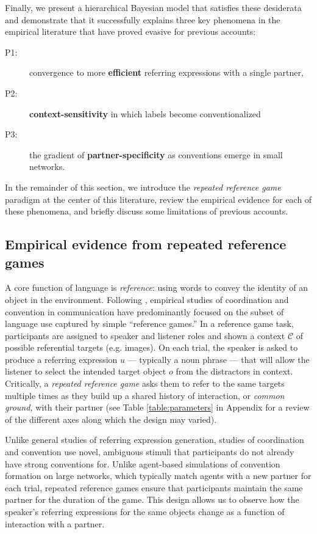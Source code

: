 Finally, we present a hierarchical Bayesian model that satisfies these desiderata and demonstrate that it successfully explains three key phenomena in the empirical literature that have proved evasive for previous accounts: 
\begin{description}
\item[P1:] convergence to more \textbf{efficient} referring expressions with a single partner, 
\item[P2:] \textbf{context-sensitivity} in which labels become conventionalized
\item[P3:] the gradient of \textbf{partner-specificity} as conventions emerge in small networks.
\end{description}
In the remainder of this section, we introduce the \emph{repeated reference game} paradigm at the center of this literature, review the empirical evidence for each of these phenomena, and briefly discuss some limitations of previous accounts.

\subsection{Empirical evidence from repeated reference games}

A core function of language is \emph{reference}: using words to convey the identity of an object in the environment. 
Following , empirical studies of coordination and convention in communication have predominantly focused on the subset of language use captured by simple ``reference games.'' 
In a reference game task, participants are assigned to speaker and listener roles and shown a context $\mathcal{C}$ of possible referential targets (e.g. images).
On each trial, the speaker is asked to produce a referring expression $u$ --- typically a noun phrase --- that will allow the listener to select the intended target object $o$ from the distractors in context.
Critically, a \emph{repeated reference game} asks them to refer to the same targets multiple times as they build up a shared history of interaction, or \emph{common ground,} with their partner (see Table \ref{table:parameters} in Appendix for a review of the different axes along which the design may varied).

Unlike general studies of referring expression generation, studies of coordination and convention use novel, ambiguous stimuli that participants do not already have strong conventions for.
Unlike agent-based simulations of convention formation on large networks, which typically match agents with a new partner for each trial, repeated reference games ensure that participants maintain the same partner for the duration of the game.
This design allows us to observe how the speaker's referring expressions for the same objects change as a function of interaction with a partner.

